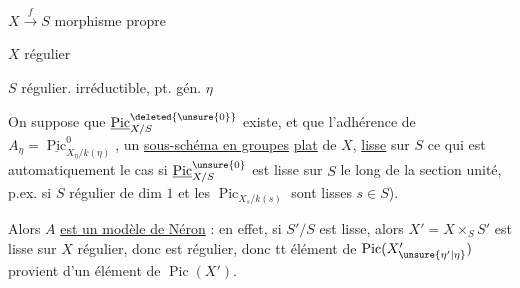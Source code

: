 $X\xrightarrow{f}S$ morphisme  propre

$X$ régulier

$S$ régulier. irréductible, pt. gén. $\eta$

On suppose que $\underline{\operatorname{Pic}}_{X/S}^{\deleted{\unsure{0}}}$ existe, et 
 que l’adhérence  de $A_\eta=\underline{\operatorname{Pic}}_{X_\eta/k(\eta)}^{0}$,  un
\uline{sous-schéma en groupes} \uline{plat} de $X$, 
\uline{lisse} sur $S$  ce qui est automatiquement
le cas si $\underline{\operatorname{Pic}}^{\unsure{0}}_{X/S}$ est lisse sur $S$ le long de
la section unité, p.ex. si $S$ régulier de dim $1$
et les $\operatorname{Pic}_{X_s/k(s)}$ sont lisses $s\in S$).

Alors  $A$ \uline{est un modèle de Néron} :
en effet, si $S'/S$ est lisse, alors
$X'=X\times_S S'$ est lisse sur $X$ régulier, donc est
régulier, donc tt  élément de $\operatorname{Pic}(X'_{\unsure{\eta'|\eta}})$
provient d’un élément de $\operatorname{Pic}(X')$.


